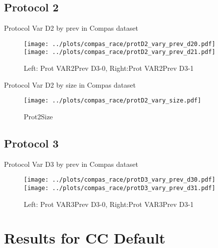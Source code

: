 \documentclass[10pt,a4paper]{article}
\begin{document}
\clearpage
\newpage
\subsection{Protocol 2}

\begin{table}[h!]
\small

\caption{Protocol Var D2 by prev in Compas dataset}
\end{table}

\begin{figure}[h!]
\texttt{[image: ../plots/compas\_race/protD2\_vary\_prev\_d20.pdf]}
\texttt{[image: ../plots/compas\_race/protD2\_vary\_prev\_d21.pdf]}
\caption{Left: Prot VAR2Prev D3-0, Right:Prot VAR2Prev D3-1}
\end{figure}

\begin{table}[h!]
\small

\caption{Protocol Var D2 by size in Compas dataset}
\end{table}

\begin{figure}[h!]
\center
\texttt{[image: ../plots/compas\_race/protD2\_vary\_size.pdf]}
\caption{Prot2Size}
\end{figure}

\clearpage
\newpage
\subsection{Protocol 3}

\begin{table}[h!]
\small

\caption{Protocol Var D3 by prev in Compas dataset}
\end{table}

\begin{figure}[h!]
\texttt{[image: ../plots/compas\_race/protD3\_vary\_prev\_d30.pdf]}
\texttt{[image: ../plots/compas\_race/protD3\_vary\_prev\_d31.pdf]}
\caption{Left: Prot VAR3Prev D3-0, Right:Prot VAR3Prev D3-1}
\end{figure}


\clearpage
\newpage
\section{Results for CC Default}
\end{document}
